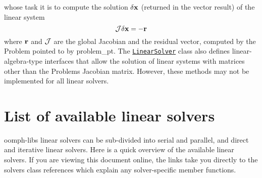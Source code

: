 whose task it is to compute the solution $ \delta {\bf x} $ (returned in the vector {\ttfamily result}) of the linear system \[ {\cal J} \delta {\bf x} = -{\bf r} \] where $ {\bf r} $ and $ {\cal J} $ are the global Jacobian and the residual vector, computed by the {\ttfamily Problem} pointed to by {\ttfamily problem\+\_\+pt}. The \href{../../the_data_structure/html/classoomph_1_1LinearSolver.html}{\tt {\ttfamily  Linear\+Solver}} class also defines linear-\/algebra-\/type interfaces that allow the solution of linear systems with matrices other than the {\ttfamily Problem\textquotesingle{}s} Jacobian matrix. However, these methods may not be implemented for all linear solvers.



 

\hypertarget{index_available_solvers}{}\section{List of available linear solvers}\label{index_available_solvers}
{\ttfamily oomph-\/lib\textquotesingle{}s} linear solvers can be sub-\/divided into serial and parallel, and direct and iterative linear solvers. Here is a quick overview of the available linear solvers. If you are viewing this document online, the links take you directly to the solvers\textquotesingle{} class references which explain any solver-\/specific member functions.


